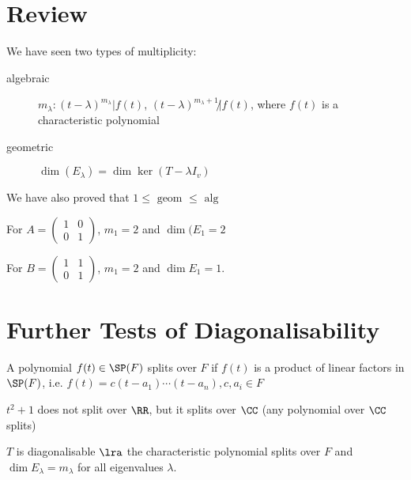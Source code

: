 \documentclass[11pt]{scrartcl}
\begin{document}
\section{Review}

We have seen two types of multiplicity:

\begin{description}

\item[algebraic] $m_{\lambda}: (t-\lambda)^{m_{\lambda}} | f(t)$,
  $(t-\lambda)^{m_{\lambda} + 1} \not | f(t)$, where $f(t)$ is a characteristic polynomial
\item[geometric] $\dim(E_{\lambda}) = \dim \ker(T-\lambda I_{v})$
\end{description}

We have also proved that $1\leq \text{ geom } \leq \text{ alg}$

\begin{example}

For $A = \begin{pmatrix}
  1 & 0\\
  0 & 1
\end{pmatrix}$, $m_{1} = 2$ and $\dim(E_{1} = 2$

For $B = \begin{pmatrix}
1 & 1\\
0 & 1
\end{pmatrix}$, $m_{1} = 2$ and $\dim E_{1} = 1$.
\end{example}
\section{Further Tests of Diagonalisability}
\begin{definition}
  A polynomial $f(t) \in \SP(F)$ splits over $F$ if $f(t)$ is a
  product of linear factors in $\SP(F)$, i.e. $f(t) = c(t-a_1)\cdots(t-a_{n}), c, a_i \in F$
\end{definition}

\begin{example}

  $t^{2} + 1$ does not split over $\RR$, but it splits over $\CC$ (any
  polynomial over $\CC$ splits)

\end{example}

\begin{claim}
\label{sec:furth-tests-diag}
  $T$ is diagonalisable $\lra$ the characteristic polynomial splits
  over $F$ and $\dim E_{\lambda} = m_{\lambda}$ for all eigenvalues
  $\lambda$.
\end{claim}
\end{document}

